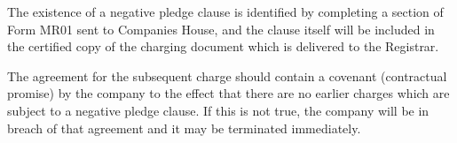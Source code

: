 \documentclass[
]{article}
\newenvironment{Shaded}{}{}
\newcommand{\NormalTok}[1]{#1}
\begin{document}
The existence of a negative pledge clause is identified by completing a
section of Form MR01 sent to Companies House, and the clause itself will
be included in the certified copy of the charging document which is
delivered to the Registrar.

\begin{Shaded}
\begin{Highlighting}[]
\NormalTok{The agreement for the subsequent charge should contain a covenant (contractual promise) by the company to the effect that there are no earlier charges which are subject to a negative pledge clause. If this is not true, the company will be in breach of that agreement and it may be terminated immediately.}
\end{Highlighting}
\end{Shaded}
\end{document}
